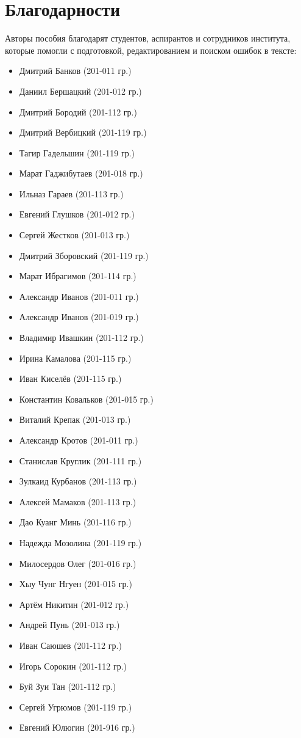 \section*{Благодарности}
Авторы пособия благодарят студентов, аспирантов и сотрудников института, которые помогли с подготовкой, редактированием и поиском ошибок в тексте:

\begin{itemize}
	\item Дмитрий Банков (201-011 гр.)
	\item Даниил Бершацкий (201-012 гр.)
	\item Дмитрий Бородий (201-112 гр.)
	\item Дмитрий Вербицкий (201-119 гр.)
	\item Тагир Гадельшин (201-119 гр.)
	\item Марат Гаджибутаев (201-018 гр.)
	\item Ильназ Гараев (201-113 гр.)
	\item Евгений Глушков (201-012 гр.)
	\item Сергей Жестков (201-013 гр.)
	\item Дмитрий Зборовский (201-119 гр.)
	\item Марат Ибрагимов (201-114 гр.)
	\item Александр Иванов (201-011 гр.)
	\item Александр Иванов (201-019 гр.)
	\item Владимир Ивашкин (201-112 гр.)
	\item Ирина Камалова (201-115 гр.)
	\item Иван Киселёв (201-115 гр.)
	\item Константин Ковальков (201-015 гр.)
	\item Виталий Крепак (201-013 гр.)
	\item Александр Кротов (201-011 гр.)
	\item Станислав Круглик (201-111 гр.)
	\item Зулкаид Курбанов (201-113 гр.)
	\item Алексей Мамаков (201-113 гр.)
	\item Дао Куанг Минь (201-116 гр.)
	\item Надежда Мозолина (201-119 гр.)
	\item Милосердов Олег (201-016 гр.)
	\item Хыу Чунг Нгуен (201-015 гр.)
	\item Артём Никитин (201-012 гр.)
	\item Андрей Пунь (201-013 гр.)
	\item Иван Саюшев (201-112 гр.)
	\item Игорь Сорокин (201-112 гр.)
	\item Буй Зуи Тан (201-112 гр.)
	\item Сергей Угрюмов (201-119 гр.)
	\item Евгений Юлюгин (201-916 гр.)
\end{itemize}
